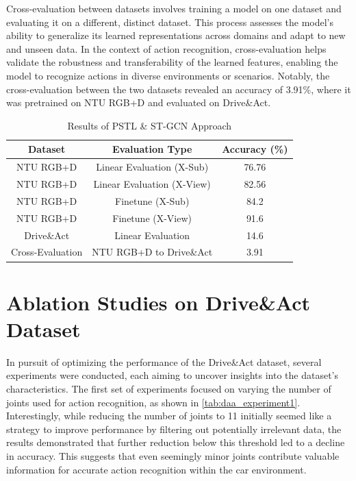Cross-evaluation between datasets involves training a model on one dataset and evaluating it on a different, distinct dataset. This process assesses the model's ability to generalize its learned representations across domains and adapt to new and unseen data. In the context of action recognition, cross-evaluation helps validate the robustness and transferability of the learned features, enabling the model to recognize actions in diverse environments or scenarios. Notably, the cross-evaluation between the two datasets revealed an accuracy of 3.91\%, where it was pretrained on NTU RGB+D and evaluated on Drive\&Act.

\begin{table}[h]
\centering
\caption{Results of PSTL \& ST-GCN Approach}
\label{tab:pstl_experiments}
\begin{tabular}{|c|c|c|}
\hline
Dataset & Evaluation Type & Accuracy (\%) \\
\hline
NTU RGB+D & Linear Evaluation (X-Sub) & 76.76 \\
NTU RGB+D & Linear Evaluation (X-View) & 82.56 \\
NTU RGB+D & Finetune (X-Sub) & 84.2 \\
NTU RGB+D & Finetune (X-View) & 91.6 \\
Drive\&Act & Linear Evaluation & 14.6 \\
Cross-Evaluation & NTU RGB+D to Drive\&Act & 3.91 \\
\hline
\end{tabular}
\end{table}



\section{Ablation Studies on Drive\&Act Dataset}
In pursuit of optimizing the performance of the Drive\&Act dataset, several experiments were conducted, each aiming to uncover insights into the dataset's characteristics. The first set of experiments focused on varying the number of joints used for action recognition, as shown in \ref{tab:daa_experiment1}. Interestingly, while reducing the number of joints to 11 initially seemed like a strategy to improve performance by filtering out potentially irrelevant data, the results demonstrated that further reduction below this threshold led to a decline in accuracy. This suggests that even seemingly minor joints contribute valuable information for accurate action recognition within the car environment. 

